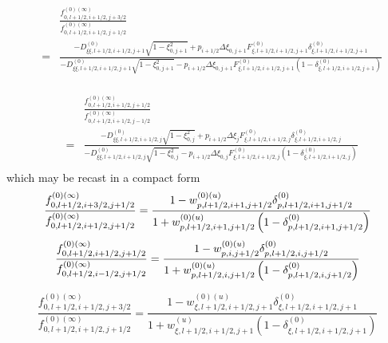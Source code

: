 \begin{eqnarray}
&&\frac{f_{0,l+1/2,i+1/2,j+3/2}^{\left( 0\right) (\infty )}}{
f_{0,l+1/2,i+1/2,j+1/2}^{\left( 0\right) (\infty )}}  \nonumber \\
&=&\frac{-D_{\xi \xi ,l+1/2,i+1/2,j+1}^{\left( 0\right) }\sqrt{1-\xi
_{0,j+1}^{2}}+p_{i+1/2}\Delta \xi _{0,j+1}F_{\xi ,l+1/2,i+1/2,j+1}^{\left(
0\right) }\delta _{\xi ,l+1/2,i+1/2,j+1}^{\left( 0\right) }}{-D_{\xi \xi
,l+1/2,i+1/2,j+1}^{\left( 0\right) }\sqrt{1-\xi _{0,j+1}^{2}}%
-p_{i+1/2}\Delta \xi _{0,j+1}F_{\xi ,l+1/2,i+1/2,j+1}^{\left( 0\right)
}\left( 1-\delta _{\xi ,l+1/2,i+1/2,j+1}^{\left( 0\right) }\right) } \nonumber \\
\end{eqnarray}

\begin{eqnarray}
&&\frac{f_{0,l+1/2,i+1/2,j+1/2}^{\left( 0\right) (\infty )}}{
f_{0,l+1/2,i+1/2,j-1/2}^{\left( 0\right) (\infty )}}  \nonumber \\
&=&\frac{-D_{\xi \xi ,l+1/2,i+1/2,j}^{\left( 0\right) }\sqrt{1-\xi _{0,j}^{2}%
}+p_{i+1/2}\Delta \xi _{j}F_{\xi ,l+1/2,i+1/2,j}^{\left( 0\right) }\delta
_{\xi ,l+1/2,i+1/2,j}^{\left( 0\right) }}{-D_{\xi \xi
,l+1/2,i+1/2,j}^{\left( 0\right) }\sqrt{1-\xi _{0,j}^{2}}-p_{i+1/2}\Delta
\xi _{0,j}F_{\xi ,l+1/2,i+1/2,j}^{\left( 0\right) }\left( 1-\delta _{\xi
,l+1/2,i+1/2,j}^{\left( 0\right) }\right) } \nonumber \\
\end{eqnarray}
which may be recast in a compact form
\begin{equation}
\frac{f_{0,l+1/2,i+3/2,j+1/2}^{\left( 0\right) (\infty )}}{
f_{0,l+1/2,i+1/2,j+1/2}^{\left( 0\right) (\infty )}}=\frac{%
1-w_{p,l+1/2,i+1,j+1/2}^{\left( 0\right) (u)}\delta
_{p,l+1/2,i+1,j+1/2}^{\left( 0\right) }}{1+w_{p,l+1/2,i+1,j+1/2}^{\left(
0\right) (u)}\left( 1-\delta _{p,l+1/2,i+1,j+1/2}^{\left( 0\right) }\right) }
\end{equation}
\begin{equation}
\frac{f_{0,l+1/2,i+1/2,j+1/2}^{\left( 0\right) (\infty )}}{
f_{0,l+1/2,i-1/2,j+1/2}^{\left( 0\right) (\infty )}}=\frac{%
1-w_{p,i,j+1/2}^{\left( 0\right) (u)}\delta _{p,l+1/2,i,j+1/2}^{\left(
0\right) }}{1+w_{p,l+1/2,i,j+1/2}^{\left( 0\right) (u)}\left( 1-\delta
_{p,l+1/2,i,j+1/2}^{\left( 0\right) }\right) }
\end{equation}

\begin{equation}
\frac{f_{0,l+1/2,i+1/2,j+3/2}^{\left( 0\right) (\infty )}}{
f_{0,l+1/2,i+1/2,j+1/2}^{\left( 0\right) (\infty )}}=\frac{1-w_{\xi
,l+1/2,i+1/2,j+1}^{\left( 0\right) (u)}\delta _{\xi
,l+1/2,i+1/2,j+1}^{\left( 0\right) }}{1+w_{\xi ,l+1/2,i+1/2,j+1}^{(u)}\left(
1-\delta _{\xi ,l+1/2,i+1/2,j+1}^{\left( 0\right) }\right) }
\end{equation}


